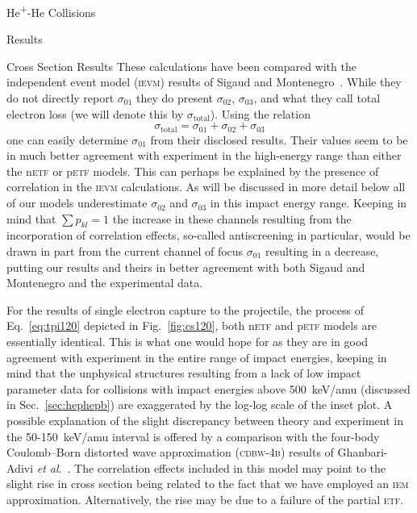 \documentclass[a5paper, 9 pt]{extreport}
\begin{document}
\begin{chapter}{\texorpdfstring{He\textsuperscript{+}}{He+}-He Collisions \label{chap:hephe}}
\begin{section}{Results \label{sec:hephe-disc}}
\begin{subsection}{Cross Section Results \label{sec:hephe-res}}
         These calculations have been compared with the independent event model (\textsc{ievm}) results
         of Sigaud and Montenegro~\cite{SM-03}. While they do not directly report $\sigma_{01}$ they do
         present $\sigma_{02}$, $\sigma_{03}$, and what they call total electron loss (we will denote
         this by $\sigma_\mathrm{total}$). Using the relation
         \begin{equation} \label{eq:total}
            \sigma_\mathrm{total} = \sigma_{01} + \sigma_{02} + \sigma_{03}
         \end{equation}
         one can easily determine $\sigma_{01}$ from their disclosed results. Their values seem to be in
         much better agreement with experiment in the high-energy range than either the n\textsc{etf} or
         p\textsc{etf} models. This can perhaps be explained by the presence of correlation in the
         \textsc{ievm} calculations. As will be discussed in more detail below all of our models
         underestimate $\sigma_{02}$ and $\sigma_{03}$ in this impact energy range. Keeping in mind that
         $\sum p_{kl} = 1$ the increase in these channels resulting from the incorporation of
         correlation effects, so-called antiscreening in particular, would be drawn in part from the
         current channel of focus $\sigma_{01}$ resulting in a decrease, putting our results and theirs
         in better agreement with both Sigaud and Montenegro and the experimental data.

         For the results of single electron capture to the projectile, the process of
         Eq.~\eqref{eq:tpi120} depicted in Fig.~\ref{fig:cs120}, both n\textsc{etf} and p\textsc{etf}
         models are essentially identical. This is what one would hope for as they are in good agreement
         with experiment in the entire range of impact energies, keeping in mind that the unphysical
         structures resulting from a lack of low impact parameter data for collisions with impact
         energies above 500~keV/amu (discussed in Sec.~\ref{sec:hephepb}) are exaggerated by the log-log
         scale of the inset plot. A possible explanation of the slight discrepancy between theory and
         experiment in the 50-150~keV/amu interval is offered by a comparison with the four-body
         Coulomb–Born distorted wave approximation (\textsc{cdbw-4b}) results of Ghanbari-Adivi
         \textit{et al}.~\cite{GAG15}. The correlation effects included in this model may point to the
         slight rise in cross section being related to the fact that we have employed an \textsc{iem}
         approximation. Alternatively, the rise may be due to a failure of the partial \textsc{etf}.


\end{subsection}
\end{section}
\end{chapter}
\end{document}
